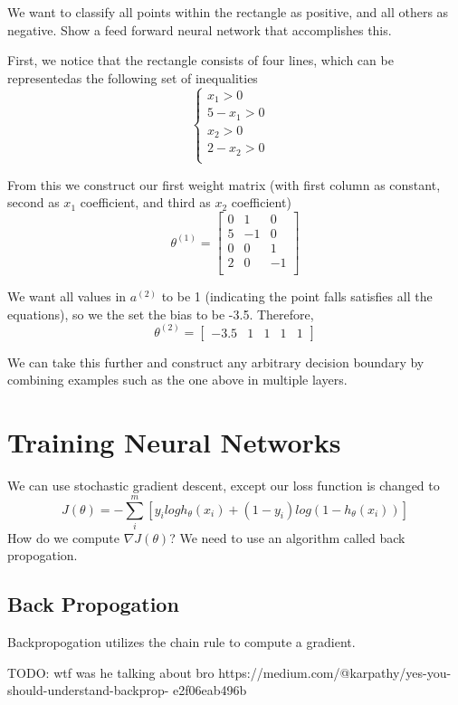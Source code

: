 \begin{example}
    \begin{center}
    \end{center}

    We want to classify all points within the rectangle as positive, and all others as negative. Show a feed forward neural network that accomplishes this. 

    First, we notice that the rectangle consists of four lines, which can be representedas the following set of inequalities
    \begin{equation*}
        \begin{cases}
            x_1 > 0 & \\
            5 - x_1 > 0 & \\
            x_2 > 0 & \\
            2 - x_2 > 0 & \\
        \end{cases}
    \end{equation*}

    From this we construct our first weight matrix (with first column as constant, second as $x_1$ coefficient, and third as $x_2$ coefficient)
    \[ \theta^{(1)} = \begin{bmatrix}
        0 & 1 & 0 \\
        5 & -1 & 0 \\
        0 & 0 & 1 \\
        2 & 0 & -1 \\
    \end{bmatrix} 
    \]

    We want all values in $a^{(2)}$ to be 1 (indicating the point falls satisfies all the equations), so we the set the bias to be -3.5. Therefore,
    \[
        \theta^{(2)} = \begin{bmatrix}
            -3.5 & 1 & 1 & 1 & 1
        \end{bmatrix}
    \]

    We can take this further and construct any arbitrary decision boundary by combining examples such as the one above in multiple layers. 
\end{example}

\section{Training Neural Networks}
We can use stochastic gradient descent, except our loss function is changed to 
\[
    J(\theta)   = -\sum_i^m[y_ilogh_\theta(x_i) + (1-y_i)log(1-h_\theta(x_i))]
\]
How do we compute $\nabla J(\theta)$? We need to use an algorithm called back propogation.

\subsection*{Back Propogation}
Backpropogation utilizes the chain rule to compute a gradient.

TODO: wtf was he talking about bro https://medium.com/@karpathy/yes-you-should-understand-backprop-
e2f06eab496b
